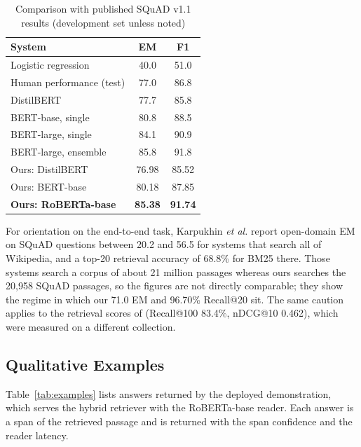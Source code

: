 \documentclass[conference]{IEEEtran}
\newcommand{\best}[1]{\textbf{#1}}
\begin{document}
\begin{table}[t]
\centering
\caption{Comparison with published SQuAD v1.1 results (development set unless noted)}
\label{tab:published}
\footnotesize
\begin{tabular}{@{}lcc@{}}
\toprule
\textbf{System} & \textbf{EM} & \textbf{F1} \\
\midrule
Logistic regression \cite{rajpurkar2016}        & 40.0 & 51.0 \\
Human performance (test) \cite{rajpurkar2016}   & 77.0 & 86.8 \\
DistilBERT \cite{sanh2019}                      & 77.7 & 85.8 \\
BERT-base, single \cite{devlin2019}             & 80.8 & 88.5 \\
BERT-large, single \cite{devlin2019}            & 84.1 & 90.9 \\
BERT-large, ensemble \cite{devlin2019}          & 85.8 & 91.8 \\
\midrule
Ours: DistilBERT                                & 76.98 & 85.52 \\
Ours: BERT-base                                 & 80.18 & 87.85 \\
\textbf{Ours: RoBERTa-base}                     & \best{85.38} & \best{91.74} \\
\bottomrule
\end{tabular}
\end{table}

For orientation on the end-to-end task, Karpukhin \emph{et al.} \cite{karpukhin2020} report
open-domain EM on SQuAD questions between 20.2 and 56.5 for systems that search all of
Wikipedia, and a top-20 retrieval accuracy of 68.8\% for BM25 there. Those systems search a
corpus of about 21 million passages whereas ours searches the 20,958 SQuAD passages, so the
figures are not directly comparable; they show the regime in which our 71.0 EM and 96.70\%
Recall@20 sit. The same caution applies to the retrieval scores of \cite{mageshwari2026}
(Recall@100 83.4\%, nDCG@10 0.462), which were measured on a different collection.

\subsection{Qualitative Examples}
Table~\ref{tab:examples} lists answers returned by the deployed demonstration, which serves the
hybrid retriever with the RoBERTa-base reader. Each answer is a span of the retrieved passage and
is returned with the span confidence and the reader latency.
\end{document}
